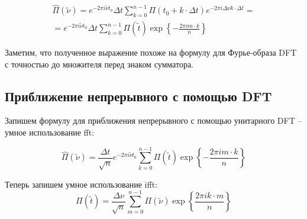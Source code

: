 \documentclass[a5paper, 10pt]{article}
\theoremstyle{definition}
\theoremstyle{plain}
\theoremstyle{remark}
\begin{document}
\begin{multline}
\hat{\Pi}(\widetilde{\nu}) = e^{ - 2\pi  i \widetilde{\nu} t_0} \Delta t  \sum \limits_{k=0}^{n-1} \Pi(t_0 + k \cdot \Delta t)  e^{ - 2\pi  i \Delta \nu  k \cdot \Delta t}= \\ = e^{ - 2\pi  i \widetilde{\nu} t_0} \Delta t  \sum \limits_{k=0}^{n-1} \Pi(\widetilde{t})  \exp \left\{ - \frac{2\pi  i  m \cdot k}{n} \right\}
\end{multline}

Заметим, что полученное выражение похоже на формулу для Фурье-образа DFT с точностью до множителя перед знаком сумматора.




\subsection{Приближение непрерывного с помощью DFT}
Запишем формулу для приближения непрерывного с помощью унитарного DFT -- умное использование fft:

\begin{equation}
\hat{\Pi}(\widetilde{\nu}) = \frac{\Delta t }{\sqrt{n}} e^{ - 2\pi  i \widetilde{\nu} t_0}  \sum \limits_{k=0}^{n-1} \Pi(\widetilde{t})  \exp \left\{ - \frac{2\pi  i  m \cdot k}{n} \right\}
\end{equation}

Теперь запишем умное использование ifft:
\begin{equation}
\Pi (\widetilde{t}) = \frac{\Delta \nu }{\sqrt{n}}   \sum \limits_{m=0}^{n-1} \Pi(\widetilde{\nu})  \exp \left\{  \frac{2\pi  i  k \cdot m}{n} \right\} 
\end{equation}
\end{document}
